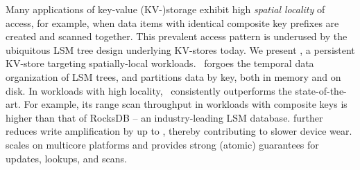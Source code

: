 Many applications of key-value (KV-)storage exhibit high \emph{spatial locality}
of access, for example, when data items with identical composite key prefixes are created and  scanned together.  
This prevalent access pattern is underused by the ubiquitous LSM tree design underlying KV-stores today.
%
We present \sys, a persistent KV-store targeting spatially-local workloads. \sys\ forgoes the temporal data organization 
of LSM trees, and partitions data by key, both in memory and on disk. 
In workloads with high locality, \sys\  consistently outperforms the state-of-the-art. 
For example, its range scan throughput in workloads with composite keys is  higher than that 
of RocksDB -- an industry-leading LSM database.  \sys\/ further reduces write amplification 
by up to , thereby contributing to slower device wear. \sys\/ scales on multicore platforms and provides strong (atomic) guarantees for updates, lookups, and scans. 

